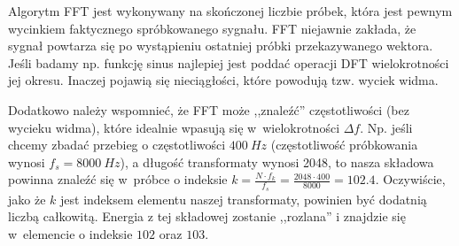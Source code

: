 Algorytm FFT jest wykonywany na skończonej liczbie próbek, która jest pewnym wycinkiem faktycznego spróbkowanego sygnału. FFT niejawnie zakłada, że sygnał powtarza się po wystąpieniu ostatniej próbki przekazywanego wektora. Jeśli badamy np. funkcję sinus najlepiej jest poddać operacji DFT wielokrotności jej okresu. Inaczej pojawią się nieciągłości, które powodują tzw. wyciek widma. 

Dodatkowo należy wspomnieć, że FFT może ,,znaleźć'' częstotliwości (bez wycieku widma), które idealnie wpasują się w~wielokrotności $\Delta f$. Np. jeśli chcemy zbadać przebieg o częstotliwości $400~Hz$ (częstotliwość próbkowania wynosi $f_s = 8000~Hz$), a długość transformaty wynosi 2048, to nasza składowa powinna znaleźć się w~próbce o indeksie $k = \frac{N\cdot f_k}{f_s} = \frac{2048\cdot400}{8000} = 102.4$. Oczywiście, jako że $k$ jest indeksem elementu naszej transformaty, powinien być dodatnią liczbą całkowitą. Energia z tej składowej zostanie ,,rozlana'' i znajdzie się w~elemencie o indeksie $102$ oraz $103$.


